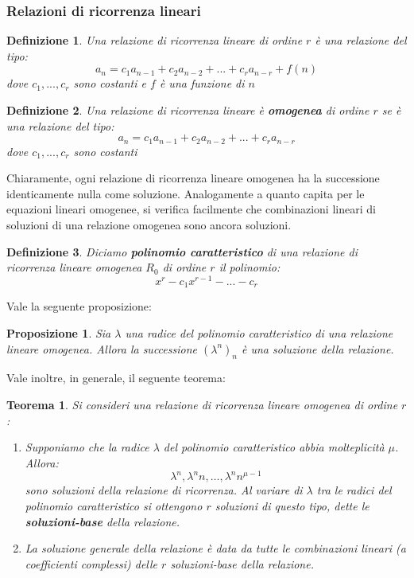 \documentclass[12pt]{article}
\newtheorem{Definizione}{Definizione}[subsection]
\newtheorem{Teorema}{Teorema}[subsection]
\newtheorem{Proposizione}{Proposizione}[subsection]
\begin{document}
\subsubsection{Relazioni di ricorrenza lineari}
\begin{Definizione}
Una relazione di ricorrenza lineare di ordine $r$ è una relazione del tipo:
$$a_n = c_1a_{n-1} + c_2a_{n-2} + ... + c_ra_{n-r} + f(n)$$
dove $c_1, ..., c_r$ sono costanti e $f$ è una funzione di $n$
\end{Definizione}
\begin{Definizione}
    Una relazione di ricorrenza lineare è \textbf{omogenea} di ordine $r$ se è una relazione
    del tipo:
    $$a_n = c_1a_{n-1} + c_2a_{n-2} + ... + c_ra_{n-r}$$
    dove $c_1,...,c_r$ sono costanti
\end{Definizione}
Chiaramente, ogni relazione di ricorrenza lineare omogenea ha la successione identicamente nulla come soluzione.
Analogamente a quanto capita per le equazioni lineari omogenee, si verifica facilmente che combinazioni lineari di soluzioni
di una relazione omogenea sono ancora soluzioni.
\begin{Definizione}
    Diciamo \textbf{polinomio caratteristico} di una relazione di ricorrenza lineare omogenea $R_0$ di ordine $r$ il polinomio:
    $$x^r - c_1x^{r-1} - ... - c_r$$
\end{Definizione}
Vale la seguente proposizione:
\begin{Proposizione}
    Sia $\lambda$ una radice del polinomio caratteristico di una relazione lineare omogenea. Allora la successione $(\lambda^n)_n$ è una soluzione della relazione.
\end{Proposizione}
Vale inoltre, in generale, il seguente teorema:
\begin{Teorema}
    Si consideri una relazione di ricorrenza lineare omogenea di ordine $r$:
    \begin{enumerate}
        \item Supponiamo che la radice $\lambda$ del polinomio caratteristico abbia molteplicità $\mu$. Allora:
        $$\lambda^n, \lambda^n n,\dots,\lambda^n n^{\mu - 1}$$
        sono soluzioni della relazione di ricorrenza. Al variare di $\lambda$ tra le radici del polinomio caratteristico si ottengono $r$ soluzioni di questo tipo, dette le \textbf{soluzioni-base} della relazione.
        \item La soluzione generale della relazione è data da tutte le combinazioni lineari (a coefficienti complessi) delle $r$ soluzioni-base della relazione.
    \end{enumerate}
\end{Teorema}
\end{document}
